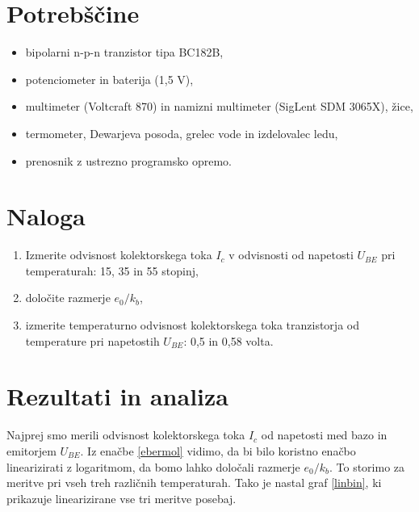 \documentclass[12pt]{article}
\begin{document}
\section{Potrebščine}

\begin{itemize}
    \item bipolarni n-p-n tranzistor tipa BC182B,
    \item potenciometer in baterija (1,5 V),
    \item multimeter (Voltcraft 870) in namizni multimeter (SigLent SDM 3065X), žice,
    \item termometer, Dewarjeva posoda, grelec vode in izdelovalec ledu,
    \item prenosnik z ustrezno programsko opremo.
\end{itemize}

\section{Naloga}

\begin{enumerate}
    \item Izmerite odvisnost kolektorskega toka $I_c$ v odvisnosti od napetosti $U_{BE}$ pri temperaturah: 15, 35 in 55 stopinj,
    \item določite razmerje $e_0/k_b$,
    \item izmerite temperaturno odvisnost kolektorskega toka tranzistorja od temperature pri napetostih $U_{BE}$: 0,5 in 0,58 volta.
\end{enumerate}


\section{Rezultati in analiza}

Najprej smo merili odvisnost kolektorskega toka $I_c$ od napetosti med bazo in emitorjem $U_{BE}$. Iz enačbe \ref{ebermol} vidimo, da bi bilo koristno enačbo linearizirati z logaritmom, da bomo lahko določali razmerje $e_0/k_b$. To storimo za meritve pri vseh treh različnih temperaturah. Tako je nastal graf \ref{linbin}, ki prikazuje linearizirane vse tri meritve posebaj.
\end{document}
